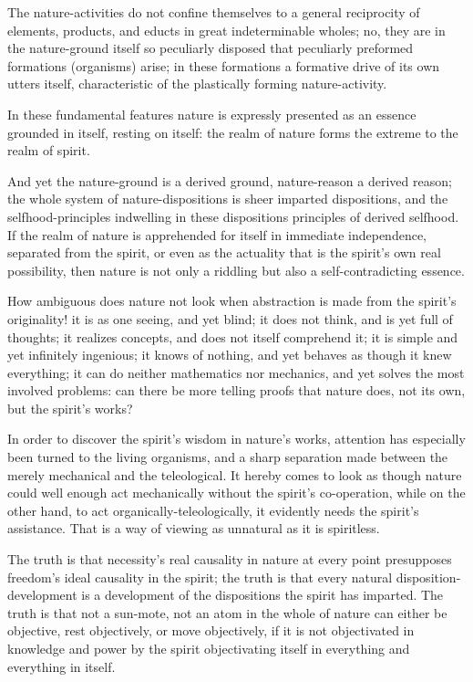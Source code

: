 \documentclass[12pt]{book}
\begin{document}
The nature-activities do not confine themselves to a general
reciprocity of elements, products, and educts in great
indeterminable wholes; no, they are in the nature-ground itself so
peculiarly disposed that peculiarly preformed formations (organisms)
arise; in these formations a formative drive of its own utters
itself, characteristic of the plastically forming nature-activity.

In these fundamental features nature is expressly presented as an
essence grounded in itself, resting on itself: the realm of nature
forms the extreme to the realm of spirit.

And yet the nature-ground is a derived ground, nature-reason a
derived reason; the whole system of nature-dispositions is sheer
imparted dispositions, and the selfhood-principles indwelling in
these dispositions principles of derived selfhood. If the realm of
nature is apprehended for itself in immediate independence,
separated from the spirit, or even as the actuality that is the
spirit's own real possibility, then nature is not only a riddling
but also a self-contradicting essence.

How ambiguous does nature not look when abstraction is made from the
spirit's originality! it is as one seeing, and yet blind; it does
not think, and is yet full of thoughts; it realizes concepts, and
does not itself comprehend it; it is simple and yet infinitely
ingenious; it knows of nothing, and yet behaves as though it knew
everything; it can do neither mathematics nor mechanics, and yet
solves the most involved problems: can there be more telling proofs
that nature does, not its own, but the spirit's works?

In order to discover the spirit's wisdom in nature's works,
attention has especially been turned to the living organisms, and a
sharp separation made between the merely
mechanical and the teleological. It hereby comes to look as though
nature could well enough act mechanically without the spirit's
co-operation, while on the other hand, to act
organically-teleologically, it evidently needs the spirit's
assistance. That is a way of viewing as unnatural as it is
spiritless.

The truth is that necessity's real causality in nature at every
point presupposes freedom's ideal causality in the spirit; the truth
is that every natural disposition-development is a development of
the dispositions the spirit has imparted. The truth is that not a
sun-mote, not an atom in the whole of nature can either be
objective, rest objectively, or move objectively, if it is not
objectivated in knowledge and power by the spirit objectivating
itself in everything and everything in itself.
\end{document}
